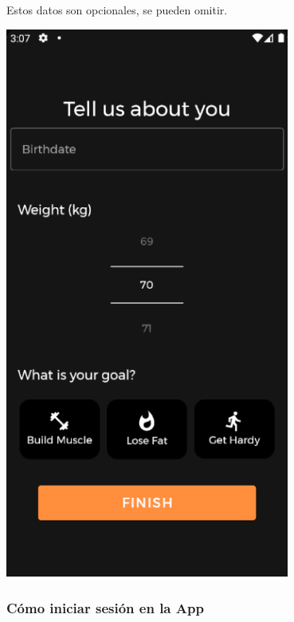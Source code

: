 \documentclass[12pt,a4paper]{article}
\begin{document}
\begin{enumerate}
\begin{minipage}{.60\textwidth}
  \item Estos datos son opcionales, se pueden omitir.
\end{minipage}
\begin{minipage}{.40\textwidth}
  \includegraphics[width=0.7\textwidth, right]{afterregisterpage}
\end{minipage}

\end{enumerate}


\subsubsection{Cómo iniciar sesión en la App}
\end{document}
